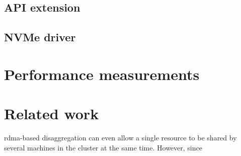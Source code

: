 \subsection{API extension}

\subsection{NVMe driver}\label{sec:nvme}


\section{Performance measurements}\label{sec:eval}

\section{Related work}\label{sec:rw}
\Gls{rdma}-based \gls{disaggregation} can even allow a single resource to be shared by several machines in the cluster at the same time. 
%
However, since 

